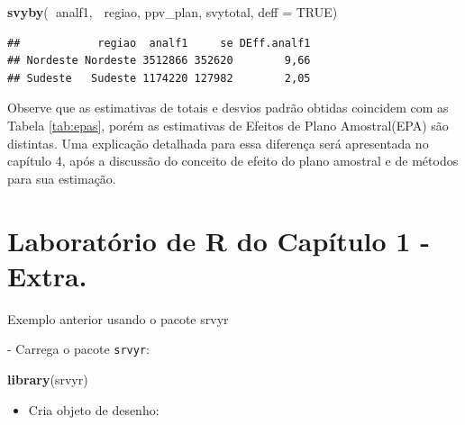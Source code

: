 \documentclass[]{book}
\newenvironment{Shaded}{\begin{snugshade}}{\end{snugshade}}
\newcommand{\KeywordTok}[1]{\textcolor[rgb]{0.13,0.29,0.53}{\textbf{#1}}}
\newcommand{\DataTypeTok}[1]{\textcolor[rgb]{0.13,0.29,0.53}{#1}}
\newcommand{\StringTok}[1]{\textcolor[rgb]{0.31,0.60,0.02}{#1}}
\newcommand{\OtherTok}[1]{\textcolor[rgb]{0.56,0.35,0.01}{#1}}
\newcommand{\OperatorTok}[1]{\textcolor[rgb]{0.81,0.36,0.00}{\textbf{#1}}}
\newcommand{\NormalTok}[1]{#1}
\providecommand{\tightlist}{%
  \setlength{\itemsep}{0pt}\setlength{\parskip}{0pt}}
\theoremstyle{definition}
\theoremstyle{definition}
\theoremstyle{definition}
\theoremstyle{remark}
\let\BeginKnitrBlock\begin \let\EndKnitrBlock\end
\begin{document}
\begin{Shaded}
\begin{Highlighting}[]
\KeywordTok{svyby}\NormalTok{(}\OperatorTok{~}\NormalTok{analf1, }\OperatorTok{~}\NormalTok{regiao, ppv_plan, svytotal, }\DataTypeTok{deff =} \OtherTok{TRUE}\NormalTok{)}
\end{Highlighting}
\end{Shaded}

\begin{verbatim}
##            regiao  analf1     se DEff.analf1
## Nordeste Nordeste 3512866 352620        9,66
## Sudeste   Sudeste 1174220 127982        2,05
\end{verbatim}

Observe que as estimativas de totais e desvios padrão obtidas coincidem
com as Tabela \ref{tab:epas}, porém as estimativas de Efeitos de Plano
Amostral(EPA) são distintas. Uma explicação detalhada para essa
diferença será apresentada no capítulo 4, após a discussão do conceito
de efeito do plano amostral e de métodos para sua estimação.

\section{Laboratório de R do Capítulo 1 -
Extra.}\label{laboratorio-de-r-do-capitulo-1---extra.}

\BeginKnitrBlock{example}
\protect\hypertarget{exm:exe13}{}{\label{exm:exe13} }Exemplo anterior usando
o pacote srvyr
\EndKnitrBlock{example} - Carrega o pacote \texttt{srvyr}:

\begin{Shaded}
\begin{Highlighting}[]
\KeywordTok{library}\NormalTok{(srvyr)}
\end{Highlighting}
\end{Shaded}

\begin{itemize}
\tightlist
\item
  Cria objeto de desenho:
\end{itemize}

\begin{Shaded}
\end{Shaded}
\end{document}

